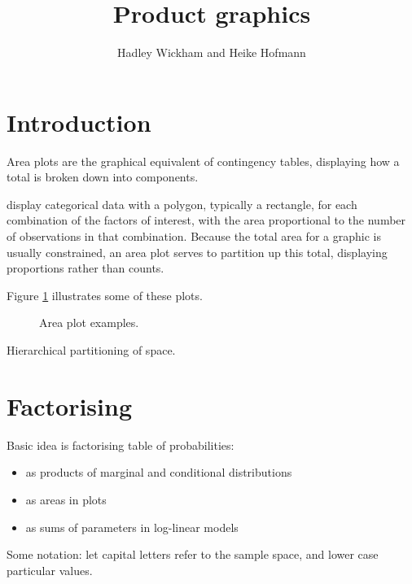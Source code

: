 \documentclass[letterpaper,oneside]{scrartcl}
\title{Product graphics}
\author{Hadley Wickham and Heike Hofmann}
\begin{document}
\maketitle
  
\section{Introduction}


%
% 

Area plots are the graphical equivalent of contingency tables, displaying how a total is broken down into components.  

display categorical data with a polygon, typically a rectangle, for each combination of the factors of interest, with the area proportional to the number of observations in that combination.  Because the total area for a graphic is usually constrained, an area plot serves to partition up this total, displaying proportions rather than counts.

Figure \ref{fig:cat-examples} illustrates some of these plots.

\begin{figure}[htbp]
  \begin{center}
  \end{center}
  \caption{Area plot examples.}
  \label{fig:cat-examples}
\end{figure}

Hierarchical partitioning of space.

\section{Factorising}

Basic idea is factorising table of probabilities:

\begin{itemize}
  \item as products of marginal and conditional distributions
  \item as areas in plots
  \item as sums of parameters in log-linear models
\end{itemize}

Some notation: let capital letters refer to the sample space, and lower case particular values.
\end{document}
